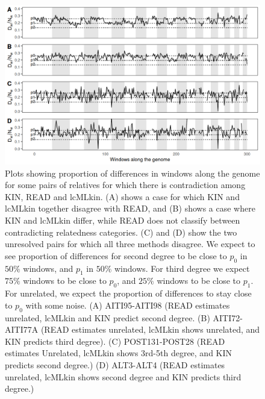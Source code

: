 \documentclass[12pt, letterpaper]{article}
\begin{document}
\begin{figure}[!ht]
    \centering
    \includegraphics[width=18cm]{supplementary_info/plots/egplot1.png}
    \caption{Plots showing proportion of differences in windows along the genome for some pairs of relatives for which there is contradiction among KIN, READ and lcMLkin. (A) shows a case for which KIN and lcMLkin together disagree with READ, and (B) shows a case where KIN and lcMLkin differ, while READ does not classify between contradicting relatedness categories. (C) and (D) show the two unresolved pairs for which all three methods disagree. We expect to see proportion of differences for second degree to be close to $p_0$ in $50\%$ windows, and $p_1$ in $50\%$ windows. For third degree we expect $75\%$ windows to be close to $p_0$, and $25\%$ windows to be close to $p_1$. For unrelated, we expect the proportion of differences to stay close to $p_0$ with some noise. (A) AITI95-AITI98 (READ estimates unrelated, lcMLkin and KIN predict second degree. (B) AITI72-AITI77A (READ estimates unrelated, lcMLkin shows unrelated, and KIN predicts third degree). (C) POST131-POST28 (READ estimates Unrelated, lcMLkin shows 3rd-5th degree, and KIN predicts second degree.) (D) ALT3-ALT4 (READ estimates unrelated, lcMLkin shows second degree and KIN predicts third degree.)}
    \label{figS8:eg1}
\end{figure}
\end{document}
